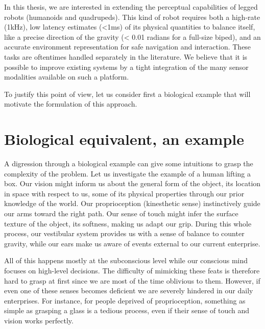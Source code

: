 In this thesis, we are interested in extending the perceptual capabilities of legged robots (humanoids and quadrupeds). This kind of robot requires both a high-rate (1kHz),
low latency estimates (<1ms) of its physical quantities to balance itself, like a precise direction of the gravity (< 0.01 radians for a full-size biped), 
and an accurate environment representation for safe navigation and interaction.
These tasks are oftentimes handled separately in the literature. We believe that it is possible to improve existing systems by a tight integration of the
many sensor modalities available on such a platform.

To justify this point of view, let us consider first a biological example that will motivate the formulation of this approach.


\section{Biological equivalent, an example}

A digression through a biological example can give some intuitions to grasp the complexity of the problem. 
Let us investigate the example of a human lifting a box. Our vision might inform us about the general form of the object, 
its location in space with respect to us, some of its physical properties through our prior knowledge of the world. Our proprioception (kinesthetic sense) 
instinctively guide our arms toward the right path. Our sense of touch might infer the surface texture of the object,  its softness, making us 
adapt our grip. During this whole process, our vestibular system provides us with a sense of balance to counter gravity, while our ears 
make us aware of events external to our current enterprise.

All of this happens mostly at the subconscious level while our conscious mind focuses on high-level decisions.
The difficulty of mimicking these feats is therefore hard to grasp at first since we are most of the time oblivious to them.
However, if even one of these senses becomes deficient we are severely hindered in our daily enterprises. For instance, for people deprived
of proprioception, something as simple as grasping a glass is a tedious process, even if their sense of touch and vision works perfectly.



